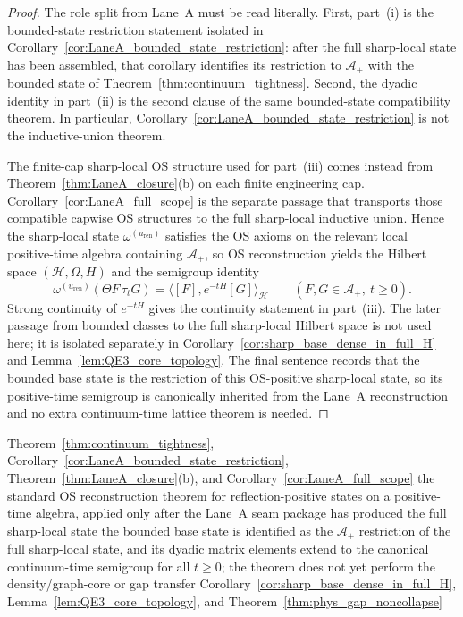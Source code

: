 \begin{proof}
The role split from Lane~A must be read literally.
First, part~(i) is the bounded-state restriction statement isolated in Corollary~\ref{cor:LaneA_bounded_state_restriction}: after the full sharp-local state has been assembled, that corollary identifies its restriction to $\mathcal A_+$ with the bounded state of Theorem~\ref{thm:continuum_tightness}.
Second, the dyadic identity in part~(ii) is the second clause of the same bounded-state compatibility theorem.
In particular, Corollary~\ref{cor:LaneA_bounded_state_restriction} is not the inductive-union theorem.

The finite-cap sharp-local OS structure used for part~(iii) comes instead from Theorem~\ref{thm:LaneA_closure}(b) on each finite engineering cap.
Corollary~\ref{cor:LaneA_full_scope} is the separate passage that transports those compatible capwise OS structures to the full sharp-local inductive union.
Hence the sharp-local state $\omega^{(u_{\mathrm{ren}})}$ satisfies the OS axioms on the relevant local positive-time algebra containing $\mathcal A_+$, so OS reconstruction yields the Hilbert space $(\mathcal H,\Omega,H)$ and the semigroup identity
\[
\omega^{(u_{\mathrm{ren}})}(\Theta F\,\tau_t G)=\langle [F],e^{-tH}[G]\rangle_{\mathcal H}
\qquad (F,G\in\mathcal A_+,\ t\ge 0).
\]
Strong continuity of $e^{-tH}$ gives the continuity statement in part~(iii).
The later passage from bounded classes to the full sharp-local Hilbert space is not used here; it is isolated separately in Corollary~\ref{cor:sharp_base_dense_in_full_H} and Lemma~\ref{lem:QE3_core_topology}.
The final sentence records that the bounded base state is the restriction of this OS-positive sharp-local state, so its positive-time semigroup is canonically inherited from the Lane~A reconstruction and no extra continuum-time lattice theorem is needed.
\end{proof}

\dependencyledger
  {Theorem~\ref{thm:continuum_tightness}, Corollary~\ref{cor:LaneA_bounded_state_restriction}, Theorem~\ref{thm:LaneA_closure}(b), and Corollary~\ref{cor:LaneA_full_scope}}
  {the standard OS reconstruction theorem for reflection-positive states on a positive-time algebra, applied only after the Lane~A seam package has produced the full sharp-local state}
  {the bounded base state is identified as the $\mathcal A_+$ restriction of the full sharp-local state, and its dyadic matrix elements extend to the canonical continuum-time semigroup for all $t\ge 0$; the theorem does not yet perform the density/graph-core or gap transfer}
  {Corollary~\ref{cor:sharp_base_dense_in_full_H}, Lemma~\ref{lem:QE3_core_topology}, and Theorem~\ref{thm:phys_gap_noncollapse}}

